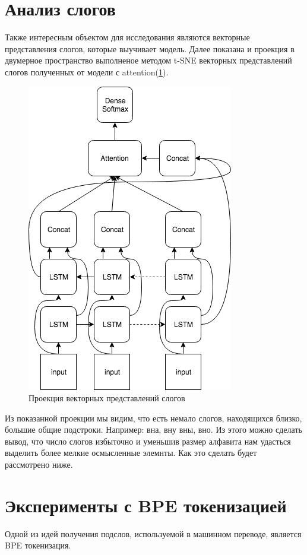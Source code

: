\documentclass[14pt, a4paper, russian]{extreport}
\begin{document}
\section{Анализ слогов}

Также интересным объектом для исследования являются векторные представления слогов, которые выучивает модель. Далее показана и проекция в двумерное пространство выполненое методом t-SNE векторных представлений слогов полученных от модели с attention(\cref{fig:tsne}).

\begin{figure}[H]
	\begin{center}
		\includegraphics[width=0.5\linewidth]{Attention}
	\end{center}
	\caption{\small{Проекция векторных представлений слогов}}
	\label{fig:tsne}
\end{figure}

Из показанной проекции мы видим, что есть немало слогов, находящихся близко, большие общие подстроки. Например: вна, вну вны, вно. Из этого можно сделать вывод, что число слогов избыточно и уменьшив размер алфавита нам удасться выделить более мелкие осмысленные элемнты. Как это сделать будет рассмотрено ниже.

\section{Эксперименты с BPE токенизацией}
Одной из идей получения подслов, используемой в машинном переводе, является BPE токенизация. 
\end{document}
